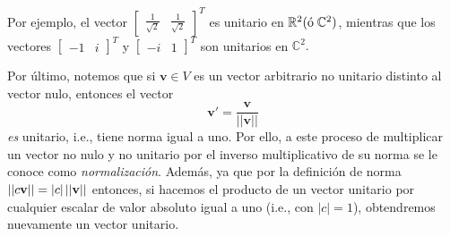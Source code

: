 \documentclass[12pt]{article}
\begin{document}
Por ejemplo, el vector $\begin{bmatrix} \frac{1}{\sqrt{2}} & \frac{1}{\sqrt{2}} \end{bmatrix}^T$ es unitario en $\mathbb{R}^2 (\text{ó}\hspace{1mm} \mathbb{C}^2)$, mientras que los vectores $\begin{bmatrix} -1 & i \end{bmatrix}^T$ y $\begin{bmatrix} -i & 1 \end{bmatrix}^T$ son unitarios en $\mathbb{C}^2.$

Por último, notemos que si $\mathbf{v}\in V$ es un vector arbitrario no unitario distinto al vector nulo, entonces el vector $$\mathbf{v}'=\frac{\mathbf{v}}{||\mathbf{v}||}$$ \emph{es} unitario, i.e., tiene norma igual a uno. Por ello, a este proceso de multiplicar un vector no nulo y no unitario por el inverso multiplicativo de su norma se le conoce como \emph{normalización}. Además, ya que por la definición de norma $||c\mathbf{v}||=|c|\hspace{0.5mm} ||\mathbf{v}||$ entonces, si hacemos el producto de un vector unitario por cualquier escalar de valor absoluto igual a uno (i.e., con $|c|=1$), obtendremos nuevamente un vector unitario.
\end{document}
